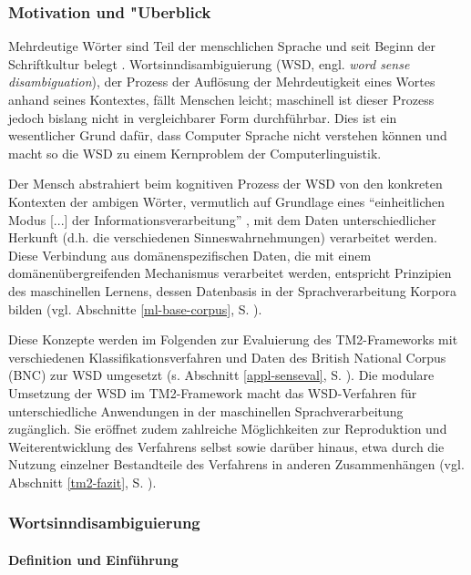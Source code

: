 \documentclass[abstracton, 12pt]{scrartcl}
\begin{document}
\subsubsection{Motivation und "Uberblick}

Mehrdeutige Wörter sind Teil der menschlichen Sprache und seit Beginn der Schriftkultur belegt \citep[153]{Haarmann1991}. Wortsinndisambiguierung (WSD, engl. \emph{word sense disambiguation}), der Prozess der Auflösung der Mehrdeutigkeit eines Wortes anhand seines Kontextes, fällt Menschen leicht; maschinell ist dieser Prozess jedoch bislang nicht in vergleichbarer Form durchführbar. Dies ist ein wesentlicher Grund dafür, dass Computer Sprache nicht verstehen können und macht so die WSD zu einem Kernproblem der Computerlingu\-istik.

Der Mensch abstrahiert beim kognitiven Prozess der WSD von den konkreten Kontexten der ambigen Wörter, vermutlich auf Grundlage eines ``einheitlichen Modus [...] der Informationsverarbeitung'' \citep[145]{Singer2002}, mit dem Daten unterschiedlicher Herkunft (d.h. die  verschiedenen Sinneswahrnehmungen) verarbeitet werden. Diese Verbindung aus domänenspezifischen Daten, die mit einem domänenübergreifenden Mechanismus verarbeitet werden, entspricht Prinzipien des maschinellen Lernens, dessen Datenbasis in der Sprachverarbeitung Korpora bilden (vgl. Abschnitte \ref{ml-base-corpus}, S. \pageref{ml-base-corpus}).

Diese Konzepte werden im Folgenden zur Evaluierung des TM2-Frameworks mit verschiedenen Klassifikationsverfahren und Daten des British National Corpus (BNC) zur WSD umgesetzt (s. Abschnitt \ref{appl-senseval}, S. \pageref{appl-senseval}). Die modulare Umsetzung der WSD im TM2-Framework macht das WSD-Verfahren für unterschiedliche Anwendungen in der maschinellen Sprachverarbeitung zugänglich. Sie eröffnet zudem zahlreiche Möglichkeiten zur Reproduktion und Weiterentwicklung des Verfahrens selbst sowie darüber hinaus, etwa durch die Nutzung einzelner Bestandteile des Verfahrens in anderen Zusammenhängen (vgl. Abschnitt \ref{tm2-fazit}, S. \pageref{tm2-fazit}).

\subsubsection{Wortsinndisambiguierung} \label{wsd-def}

\paragraph{Definition und Einführung}  
\end{document}
